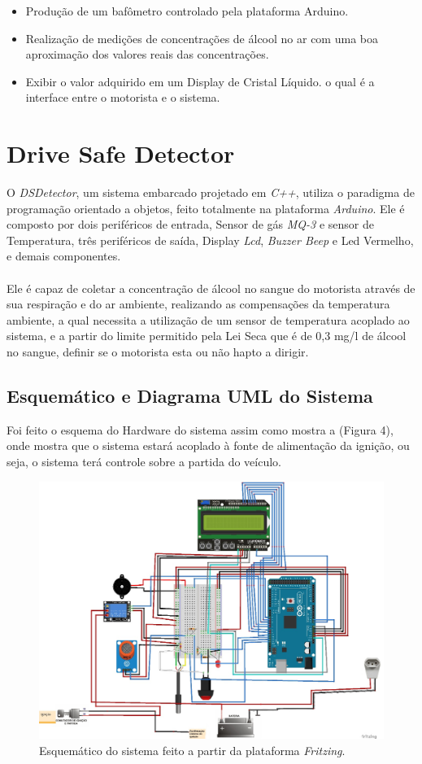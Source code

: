 \documentclass[12pt]{article}
\begin{document}
\begin{itemize}
    \item Produção de um bafômetro controlado pela plataforma
Arduino.
    \item Realização de medições de concentrações de álcool no ar com
uma boa aproximação dos valores reais das concentrações.
    \item Exibir o valor adquirido em um Display de Cristal Líquido. o qual é a interface entre o motorista e o sistema.
\end{itemize}
\section{Drive Safe Detector}

O \emph{DSDetector}, um sistema embarcado projetado em \emph{C++},
utiliza o paradigma de programação orientado a objetos, feito
totalmente na plataforma \emph{Arduino}. Ele é composto por dois
periféricos de entrada, Sensor de gás \emph{MQ-3} e sensor de
Temperatura, três periféricos de saída, Display \emph{Lcd}, \emph{Buzzer
Beep} e Led Vermelho, e demais componentes.\\ \\ Ele é capaz de coletar a concentração de álcool no sangue do motorista através de sua respiração e do ar ambiente, realizando as compensações da temperatura ambiente, a qual necessita a utilização de um sensor de temperatura acoplado ao  sistema, e a partir do limite permitido pela Lei Seca que é de 0,3 mg/l de álcool no sangue, definir se o motorista esta ou não hapto a dirigir.
\subsection{Esquemático e Diagrama UML do Sistema}

Foi feito o esquema do Hardware do sistema assim como mostra a (Figura 4), onde mostra que o sistema estará acoplado à fonte de alimentação da ignição, ou seja, o sistema terá controle sobre a partida do veículo.

\begin{figure}[ht]
\centering
\includegraphics[width=.7\textwidth]{sistema.jpg}
\caption{Esquemático do sistema feito a partir da plataforma \emph{Fritzing}.}
\label{fig:exampleFig1}
\end{figure}
\end{document}
